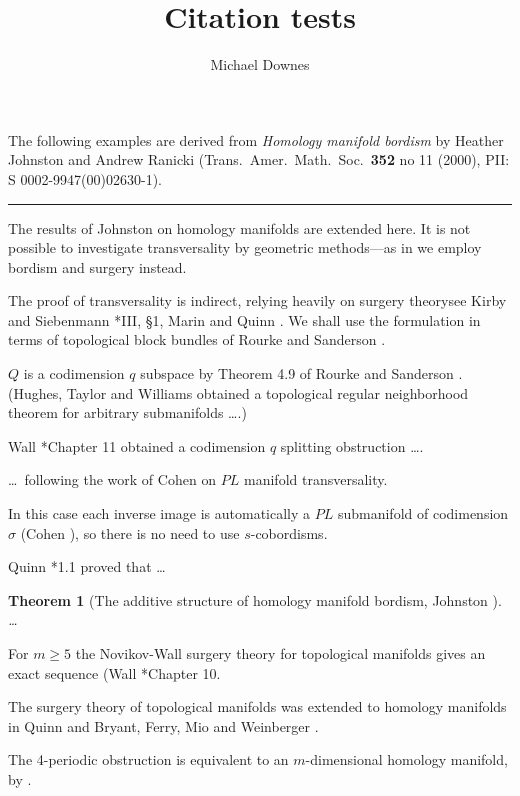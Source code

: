 \documentclass{article}
\newtheorem{thm}{Theorem}[section]
\begin{document}
\title{Citation tests}

\author{Michael Downes}

   The following examples are derived from
   \emph{Homology manifold bordism} by Heather Johnston and Andrew
   Ranicki (Trans.\ Amer.\ Math.\ Soc.\ \textbf{352} no 11 (2000), PII: S
   0002-9947(00)02630-1).

\bigskip \noindent \rule{\columnwidth}{0.5pt}\par

\setcounter{section}{3}

The results of Johnston \cite{Jo} on homology
manifolds are extended here. It is not
possible to investigate transversality by
geometric methods---as in \cite{Jo} we employ
bordism and surgery instead.

The proof of transversality is indirect,
relying heavily on surgery theory\mdash see
Kirby and Siebenmann \cite{KS}*{III, \S 1},
Marin \cite{M} and Quinn \cite{Q3}. We shall
use the formulation in terms of topological
block bundles of Rourke and Sanderson
\cite{RS}.

$Q$ is a codimension $q$ subspace by Theorem
4.9 of Rourke and Sanderson \cite{RS}.
(Hughes, Taylor and Williams \cite{HTW}
obtained a topological regular neighborhood
theorem for arbitrary submanifolds \dots.)

Wall \cite{Wa}*{Chapter 11} obtained a
codimension $q$ splitting obstruction \dots.

\dots\ following the work of Cohen \cite{Co}
on $PL$ manifold transversality.

In this case each inverse image is
automatically a $PL$ submanifold of
codimension $\sigma$ (Cohen \cite{Co}), so
there is no need to use $s$-cobordisms.

Quinn \cite{Q2}*{1.1} proved that \dots

\begin{thm}[The additive structure of
  homology manifold bordism, Johnston
  \cite{Jo}]
\dots
\end{thm}

For $m\geq 5$ the Novikov-Wall surgery theory
for topological manifolds gives an exact
sequence (Wall \cite{Wa}*{Chapter 10}.

The surgery theory of topological manifolds
was extended to homology manifolds in Quinn
\cites{Q1,Q2} and Bryant, Ferry, Mio
and Weinberger \cite{BFMW}.

The 4-periodic obstruction is equivalent to
an $m$-dimensional homology manifold, by
\cite{BFMW}.
\end{document}
